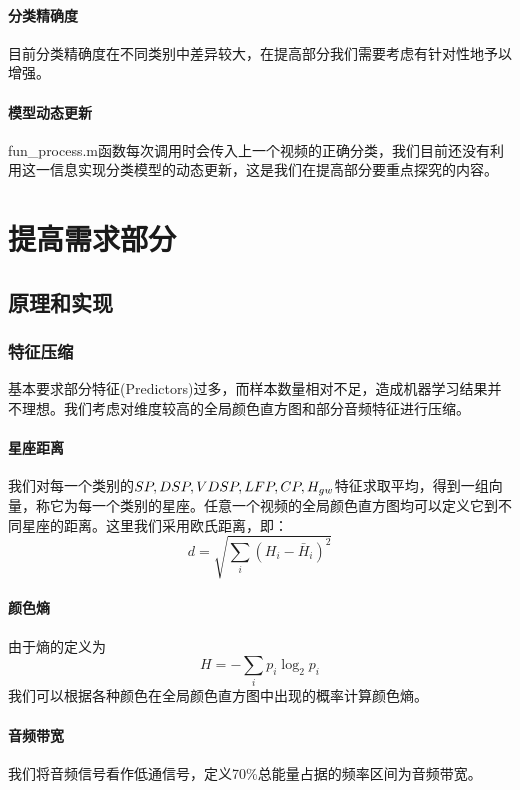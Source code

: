\documentclass{article}
\begin{document}
\begin{multicols}{2}
            \paragraph{分类精确度}
            目前分类精确度在不同类别中差异较大，在提高部分我们需要考虑有针对性地予以增强。

            \paragraph{模型动态更新}
            fun\_process.m函数每次调用时会传入上一个视频的正确分类，我们目前还没有利用这一信息实现分类模型的动态更新，这是我们在提高部分要重点探究的内容。

    \section{提高需求部分}
        \subsection{原理和实现}
            \subsubsection{特征压缩}
                基本要求部分特征(Predictors)过多，而样本数量相对不足，造成机器学习结果并不理想。我们考虑对维度较高的全局颜色直方图和部分音频特征进行压缩。

                \paragraph{星座距离}
                我们对每一个类别的$SP,DSP,VDSP,\\ LFP,CP,H_{gw}$特征求取平均，得到一组向量，称它为每一个类别的星座。任意一个视频的全局颜色直方图均可以定义它到不同星座的距离。这里我们采用欧氏距离，即：
                $$d=\sqrt{\sum_{i}(H_i-\bar{H}_i)^2}$$

                \paragraph{颜色熵}
                由于熵的定义为
                $$H=-\sum_i p_i\log_2 p_i$$
                我们可以根据各种颜色在全局颜色直方图中出现的概率计算颜色熵。

                \paragraph{音频带宽}
                我们将音频信号看作低通信号，定义70\%总能量占据的频率区间为音频带宽。


\end{multicols}
\end{document}
